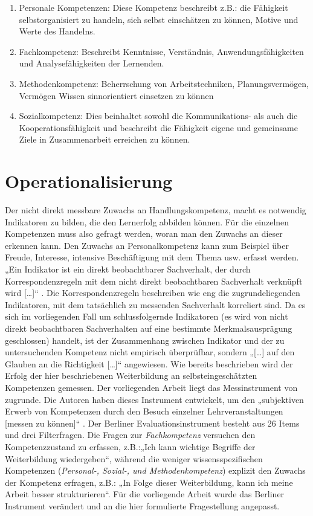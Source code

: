 \documentclass[12pt, bibliography=totoc]{scrartcl}
\begin{document}
\begin{enumerate}
\def\labelenumi{\arabic{enumi}.}
\item
  Personale Kompetenzen: Diese Kompetenz beschreibt z.B.: die Fähigkeit
  selbstorganisiert zu handeln, sich selbst einschätzen zu können,
  Motive und Werte des Handelns.
\item
  Fachkompetenz: Beschreibt Kenntnisse, Verständnis,
  Anwendungsfähigkeiten und Analysefähigkeiten der Lernenden.
\item
  Methodenkompetenz: Beherrschung von Arbeitstechniken,
  Planungsvermögen, Vermögen Wissen sinnorientiert einsetzen zu können
\item
  Sozialkompetenz: Dies beinhaltet sowohl die Kommunikations- als auch
  die Kooperationsfähigkeit und beschreibt die Fähigkeit eigene und
  gemeinsame Ziele in Zusammenarbeit erreichen zu können.
\end{enumerate}

\section{Operationalisierung}\label{operationalisierung}

Der nicht direkt messbare Zuwachs an Handlungskompetenz, macht es
notwendig Indikatoren zu bilden, die den Lernerfolg abbilden können. Für
die einzelnen Kompetenzen muss also gefragt werden, woran man den
Zuwachs an dieser erkennen kann. Den Zuwachs an Personalkompetenz kann
zum Beispiel über Freude, Interesse, intensive Beschäftigung mit dem
Thema usw. erfasst werden. „Ein Indikator ist ein direkt beobachtbarer
Sachverhalt, der durch Korrespondenzregeln mit dem nicht direkt
beobachtbaren Sachverhalt verknüpft wird {[}\ldots{]}``
\parencite[85]{Kromrey2009}. Die Korrespondenzregeln beschreiben wie eng
die zugrundeliegenden Indikatoren, mit dem tatsächlich zu messenden
Sachverhalt korreliert sind. Da es sich im vorliegenden Fall um
schlussfolgernde Indikatoren (es wird von nicht direkt beobachtbaren
Sachverhalten auf eine bestimmte Merkmalsausprägung geschlossen)
handelt, ist der Zusammenhang zwischen Indikator und der zu
untersuchenden Kompetenz nicht empirisch überprüfbar, sondern
„{[}\ldots{]} auf den Glauben an die Richtigkeit {[}\ldots{]}``
\parencite[166]{Kromrey2009} angewiesen. Wie bereits beschrieben wird
der Erfolg der hier beschriebenen Weiterbildung an selbsteingeschätzten
Kompetenzen gemessen. Der vorliegenden Arbeit liegt das Messinstrument
von \textcite{Braun2008} zugrunde. Die Autoren haben dieses Instrument
entwickelt, um den „subjektiven Erwerb von Kompetenzen durch den Besuch
einzelner Lehrveranstaltungen {[}messen zu können{]}``
\parencite[30]{Braun2008}. Der Berliner Evaluationsinstrument besteht
aus 26 Items und drei Filterfragen. Die Fragen zur \emph{Fachkompetenz}
versuchen den Kompetenzzustand zu erfassen, z.B.:„Ich kann wichtige
Begriffe der Weiterbildung wiedergeben``, während die weniger
wissensspezifischen Kompetenzen (\emph{Personal-, Sozial-, und
Methodenkompetenz}) explizit den Zuwachs der Kompetenz erfragen, z.B.:
„In Folge dieser Weiterbildung, kann ich meine Arbeit besser
strukturieren``. Für die vorliegende Arbeit wurde das Berliner
Instrument verändert und an die hier formulierte Fragestellung
angepasst.
\end{document}

